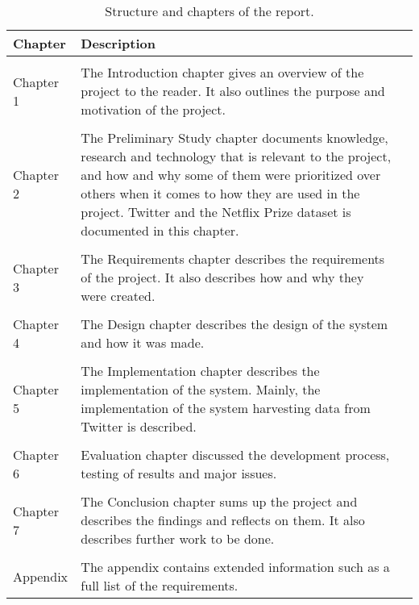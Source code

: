 \begin{table}
\centering
\begin{tabularx}{\textwidth}{ l X l }
  \textbf{Chapter}      & \textbf{Description} \\
  \hline \\ [-1.5ex]
  Chapter 1 & The Introduction chapter gives an overview of the project to the reader. It also outlines the purpose and motivation of the project. \\
  \hline \\ [-1.5ex]
  Chapter 2 & The Preliminary Study chapter documents knowledge, research and technology that is relevant to the project, and how and why some of them were prioritized over others when it comes to how they are used in the project. Twitter and the Netflix Prize dataset is documented in this chapter. \\
  \hline \\ [-1.5ex]
  Chapter 3 & The Requirements chapter describes the requirements of the project. It also describes how and why they were created. \\
  \hline \\ [-1.5ex]
  Chapter 4 & The Design chapter describes the design of the system and how it was made. \\
  \hline \\ [-1.5ex]
  Chapter 5 & The Implementation chapter describes the implementation of the system. Mainly, the implementation of the system harvesting data from Twitter is described. \\
  \hline \\ [-1.5ex]
  Chapter 6 & Evaluation chapter discussed the development process, testing of results and major issues. \\
  \hline \\ [-1.5ex]
  Chapter 7 & The Conclusion chapter sums up the project and describes the findings and reflects on them. It also describes further work to be done. \\
  \hline \\ [-1.5ex]
  Appendix & The appendix contains extended information such as a full list of the requirements. \\
\end{tabularx}
\caption{Structure and chapters of the report.}
\label{table-reportstructure}
\end{table}
